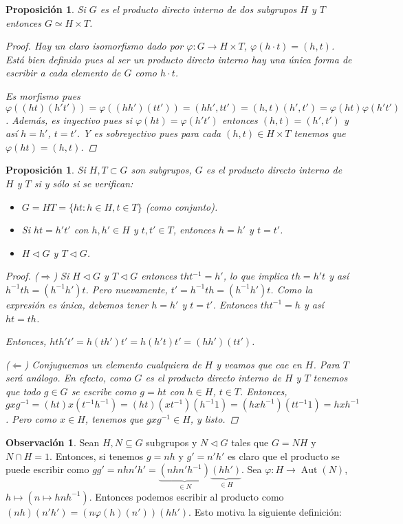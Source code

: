 \documentclass[12pt]{book}
\newtheorem{prop}[teo]{Proposición}
\theoremstyle{definition}
\newtheorem{obs}[teo]{Observación}
\DeclareMathOperator{\Aut}{Aut}
\begin{document}
\begin{prop}
Si $G$ es el producto directo interno de dos subgrupos $H$ y $T$ entonces $G\simeq H\times T$.
\begin{proof}
Hay un claro isomorfismo dado por $\varphi:G\to H\times T$, $\varphi(h\cdot t)=(h,t)$. Está bien definido pues al ser un producto directo interno hay una única forma de escribir a cada elemento de $G$ como $h\cdot t$. 

Es morfismo pues $\varphi ((ht)(h't')) = \varphi((hh')(tt')) = (hh',tt') = (h,t)(h',t') = \varphi (ht)\varphi(h't')$. Además, es inyectivo pues si $\varphi(ht)=\varphi(h't')$ entonces $(h,t)=(h',t')$ y así $h=h'$, $t=t'$. Y es sobreyectivo pues para cada $(h,t)\in H\times T$ tenemos que $\varphi(ht) = (h,t)$.
\end{proof}
\end{prop}

\begin{prop}
Si $H,T\subset G$ son subgrupos, $G$ es el producto directo interno de $H$ y $T$ si y sólo si se verifican: \begin{itemize}\item $G=HT= \{ht : h\in H, t\in T\}$ (como conjunto). \item Si $ht=h't'$ con $h,h'\in H$ y $t,t'\in T$, entonces $h=h'$ y $t=t'$. \item $H\triangleleft G$ y $T\triangleleft G$. \end{itemize}
\begin{proof}
($\Longrightarrow$) Si $H\triangleleft G$ y $T\triangleleft G$ entonces $tht^{-1} = h'$, lo que implica $th = h't$ y así $h^{-1}th = (h^{-1}h')t$. Pero nuevamente, $t' = h^{-1}th = (h^{-1}h')t$. Como la expresión es única, debemos tener $h=h'$ y $t=t'$. Entonces $tht^{-1}=h$ y así $ht=th$.

Entonces, $hth't' = h(th')t' = h(h't)t' = (hh')(tt')$.

($\Longleftarrow$) Conjuguemos un elemento cualquiera de $H$ y veamos que cae en $H$. Para $T$ será análogo. En efecto, como $G$ es el producto directo interno de $H$ y $T$ tenemos que todo $g\in G$ se escribe como $g=ht$ con $h\in H$, $t\in T$. Entonces, $gxg^{-1} = (ht)x(t^{-1}h^{-1}) = (ht)(xt^{-1})(h^{-1}1) = (hxh^{-1})(tt^{-1}1) = hxh^{-1}$. Pero como $x\in H$, tenemos que $gxg^{-1}\in H$, y listo.

\end{proof}
\end{prop}

\begin{obs}
Sean $H,N\subseteq G$ subgrupos y $N\triangleleft G$ tales que $G=NH$ y $N\cap H = 1$. Entonces, si tenemos $g=nh$ y $g'=n'h'$ es claro que el producto se puede escribir como $gg'= nhn'h' = \underbrace{(nhn'h^{-1})}_{\in N}\underbrace{(hh')}_{\in H}$. Sea $\varphi : H\to \Aut (N)$, $h\mapsto (n\mapsto hnh^{-1})$. Entonces podemos escribir al producto como $(nh)(n'h') = (n\varphi(h)(n')) (hh')$. Esto motiva la siguiente definición:
\end{obs}
\end{document}

